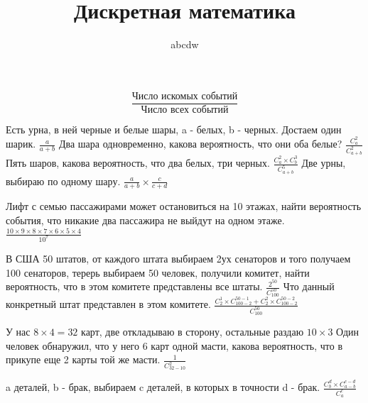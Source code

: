 \documentclass[12pt]{article}
\title{Дискретная математика}
\date{}
\author{abcdw}
\begin{document}
    \maketitle
    $$\frac{\mbox{Число искомых событий}}{\mbox{Число всех событий}}$$
    
    Есть урна, в ней черные и белые шары, a - белых, b - черных. \newline
    Достаем один шарик. $\frac{a}{a+b}$ \newline
    Два шара одновременно, какова вероятность, что они оба белые? $\frac{C_a^2}{C_{a+b}^2}$ \newline
    Пять шаров, какова вероятность, что два белых, три черных. $\frac{C_a^2 \times C_b^3}{C_{a+b}^5}$ \newline
    Две урны, выбираю по одному шару. $\frac{a}{a+b} \times \frac{c}{c+d}$ \newline

    Лифт с семью пассажирами может остановиться на 10 этажах, найти вероятность события, что никакие два пассажира не выйдут на одном этаже. $\frac{10\times 9 \times 8 \times 7 \times 6 \times 5 \times 4}{10^7}$ \newline

    В США 50 штатов, от каждого штата выбираем 2ух сенаторов и того получаем 100 сенаторов, терерь выбираем 50 человек, получили комитет, найти вероятность, что в этом комитете представлены все штаты. $\frac{2^{50}}{C_{100}^{50}}$ \newline
    Что данный конкретный штат представлен в этом комитете. $\frac{C_2^1\times C_{100 - 2}^{50 -1} + C_2^2 \times {C_{100 - 2}^{50 - 2}}}{C_{100}^{50}}$ \newline

    У нас $8 \times  4 = 32$ карт, две откладываю в сторону, остальные раздаю $10 \times 3$ \newline
    Один человек обнаружил, что у него 6 карт одной масти, какова вероятность, что в прикупе еще 2 карты той же масти. $\frac{1}{C_{32 - 10}^2}$ \newline

    a деталей, b - брак, выбираем c деталей, в которых в точности d - брак. $\frac{C_b^{d} \times C_{a-b}^{c-d}}{C_a^c}$\newline
\end{document}
